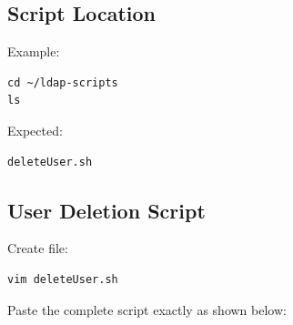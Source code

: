 \documentclass[11pt]{article}
\begin{document}
\subsection{Script Location}
\label{sec:org9095d4e}

Example:

\begin{verbatim}
cd ~/ldap-scripts
ls
\end{verbatim}

Expected:

\begin{verbatim}
deleteUser.sh
\end{verbatim}
\subsection{User Deletion Script}
\label{sec:org27f4c1c}

Create file:

\begin{verbatim}
vim deleteUser.sh
\end{verbatim}

Paste the complete script exactly as shown below:
\end{document}
